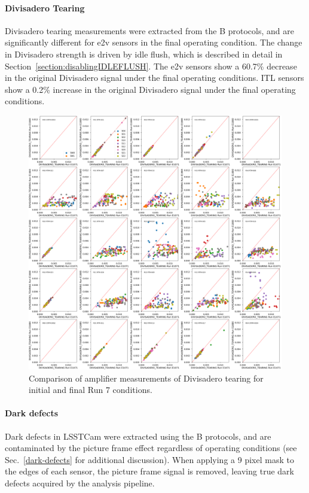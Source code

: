\clearpage
\paragraph{Divisadero Tearing}\label{final-divisadero-tearing}

Divisadero tearing measurements were extracted from the B protocols, and are significantly different for e2v sensors in the final operating condition. The change in Divisadero strength is driven by idle flush, which is described in detail in Section~\ref{section:disablingIDLEFLUSH}. The e2v sensors show a 60.7\% decrease in the original Divisadero signal under the final operating conditions. ITL sensors show a 0.2\% increase in the original Divisadero signal under the final operating conditions.

\begin{figure}[ht]
    \centering
    \includegraphics[width=0.7\linewidth]{figures/finalCharacterization/E1071_E1880_DIVISADERO_TEARING.png}
    \caption{Comparison of amplifier measurements of Divisadero tearing for initial and final Run 7 conditions.}
    \label{fig:finalChar-Divisadero-5x5}
\end{figure}


\clearpage
\paragraph{Dark defects}\label{final-dark-defects}

Dark defects in LSSTCam were extracted using the B protocols, and are contaminated by the picture frame effect regardless of operating conditions (see Sec.~\ref{dark-defects} for additional discussion). When applying a 9 pixel mask to the edges of each sensor, the picture frame signal is removed, leaving true dark defects acquired by the analysis pipeline.

